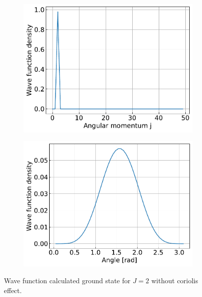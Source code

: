 \documentclass{article}
\begin{document}
\begin{figure}[H]
\begin{subfigure}{.4\linewidth}
        \end{subfigure}
        \begin{subfigure}{.4\linewidth}
            \centering
            \includegraphics[width=\linewidth]{harmonic_iso_angular.pdf}
        \end{subfigure}
        \begin{subfigure}{.4\linewidth}
            \centering
            \includegraphics[width=\linewidth]{harmonic_iso_polar.pdf}
        \end{subfigure}
        \caption{Wave function calculated ground state for $J = 2$ without coriolis effect.}
    \end{figure}
\end{document}
